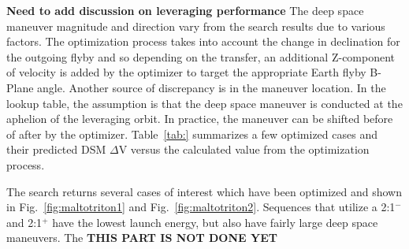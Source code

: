 \documentclass[letterpaper, preprint, paper,11pt]{AAS}	%
\begin{document}
%
%
\textbf{Need to add discussion on leveraging performance}
The deep space maneuver magnitude and direction vary from the search results due to various factors. The optimization process takes into account the change in declination for the outgoing flyby and so depending on the transfer, an additional Z-component of velocity is added by the optimizer to target the appropriate Earth flyby B-Plane angle. Another source of discrepancy is in the maneuver location. In the lookup table, the assumption is that the deep space maneuver is conducted at the aphelion of the leveraging orbit. In practice, the maneuver can be shifted before of after by the optimizer. Table~\ref{tab:} summarizes a few optimized cases and their predicted DSM $\Delta$V versus the calculated value from the optimization process.


The search returns several cases of interest which have been optimized and shown in Fig.~\ref{fig:maltotriton1} and Fig.~\ref{fig:maltotriton2}. Sequences that utilize a 2:1$^{-}$ and 2:1$^{+}$ have the lowest launch energy, but also have fairly large deep space maneuvers. The
\textbf{THIS PART IS NOT DONE YET}

\end{document}
